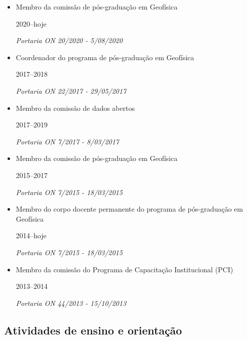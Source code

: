 \begin{itemize}
	
	\item[\parbox{0.03\textwidth}{\vspace{-0.1\baselineskip}\faUserCheck}]
	{Membro da comissão de pós-graduação em Geofísica \dotfill \parbox{0.11\textwidth}{\hfill 2020--hoje} \newline \textit{Portaria ON 20/2020 - 5/08/2020}} 
	
	\item[\parbox{0.03\textwidth}{\vspace{-0.1\baselineskip}\faUserCheck}]
	{Coordenador do programa de pós-graduação em Geofísica \dotfill \parbox{0.11\textwidth}{\hfill 2017--2018} \newline \textit{Portaria ON 22/2017 - 29/05/2017}}
	
	\item[\parbox{0.03\textwidth}{\vspace{-0.1\baselineskip}\faUserCheck}]
	{Membro da comissão de dados abertos \dotfill \parbox{0.11\textwidth}{\hfill 2017--2019} \newline \textit{Portaria ON 7/2017 - 8/03/2017}}

	\item[\parbox{0.03\textwidth}{\vspace{-0.1\baselineskip}\faUserCheck}]
	{Membro da comissão de pós-graduação em Geofísica \dotfill \parbox{0.11\textwidth}{\hfill 2015--2017} \newline \textit{Portaria ON 7/2015 - 18/03/2015}}

	\item[\parbox{0.03\textwidth}{\vspace{-0.1\baselineskip}\faUserCheck}]
	{Membro do corpo docente permanente do programa de pós-graduação em Geofísica \dotfill \parbox{0.11\textwidth}{\hfill 2014--hoje} \newline \textit{Portaria ON 7/2015 - 18/03/2015}}

	\item[\parbox{0.03\textwidth}{\vspace{-0.1\baselineskip}\faUserCheck}]
	{Membro da comissão do Programa de Capacitação Institucional (PCI) \dotfill \parbox{0.11\textwidth}{\hfill 2013--2014} \newline \textit{Portaria ON 44/2013 - 15/10/2013}}
	
\end{itemize}


\subsection*{Atividades de ensino e orientação}


